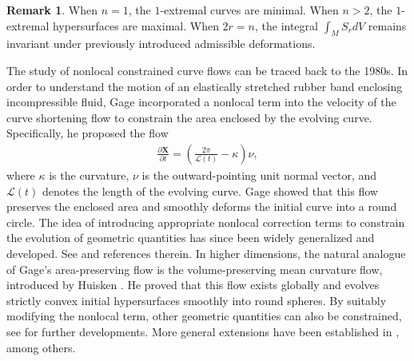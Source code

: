\documentclass[reqno,11pt, letterpaper]{amsart}
\theoremstyle{plain}
\theoremstyle{definition}
\newtheorem{rem}[thm]{Remark}
\numberwithin{equation}{section}
\begin{document}
\begin{rem}  When $n=1$, the $1$-extremal curves are minimal. When $n>2$, the $1$-extremal hypersurfaces are maximal. When $2r=n$, the integral $\displaystyle \int_MS_rdV$
remains invariant under previously introduced admissible deformations.
\end{rem}


The study of nonlocal constrained curve flows can be traced back to the 1980s.  In order to understand the motion of an elastically stretched rubber band enclosing incompressible fluid, Gage \cite{Gag85} incorporated a nonlocal term into the velocity of the curve shortening flow to constrain the area enclosed by the evolving curve. Specifically, he proposed the flow
\begin{align*}
	\frac{\partial\mathbf{X}}{\partial t}=\left(\frac{2\pi}{\mathcal{L}(t)}-\kappa\right)\nu,
\end{align*}
where $\kappa$ is the curvature, $\nu$ is the outward-pointing unit normal vector, and $\mathcal{L}(t)$ denotes the length of the evolving curve. Gage showed that this flow preserves the enclosed area and smoothly deforms the initial curve into a round circle.
The idea of introducing appropriate nonlocal correction terms to constrain the evolution of geometric quantities has since been widely generalized and developed. See \cite{TW15,GPT20.1,GPT20.2,GPT21} and references therein. 
In higher dimensions, the natural analogue of Gage's area-preserving flow is the volume-preserving mean curvature flow, introduced by Huisken \cite{Hui87}. He proved that this flow exists globally and evolves strictly convex initial hypersurfaces smoothly into round spheres. By suitably modifying the nonlocal term, other geometric quantities can also be constrained, see \cite{Coy04} for further developments. More general extensions have been established in \cite{And01, Coy05, CM07, Sin15, AW19}, among others.
\end{document}
